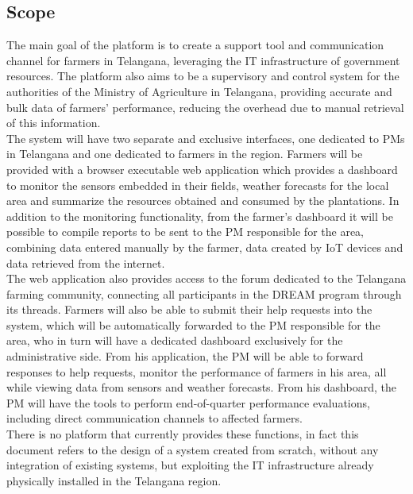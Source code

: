 \documentclass[10pt]{article} %
\begin{document}
\subsection{Scope}
The main goal of the platform is to create a support tool and communication channel for farmers in Telangana, 
leveraging the IT infrastructure of government resources. The platform also aims to be a 
supervisory and control system for the authorities of the Ministry of Agriculture in Telangana, 
providing accurate and bulk data of farmers' performance, reducing the overhead due to manual retrieval of this information.\\
The system will have two separate and exclusive interfaces, one dedicated to PMs in Telangana 
and one dedicated to farmers in the region. Farmers will be provided with a browser 
executable web application which provides a dashboard to monitor the sensors embedded 
in their fields, weather forecasts for the local area and summarize the resources 
obtained and consumed by the plantations. In addition to the monitoring functionality, 
from the farmer's dashboard it will be possible to compile reports to be sent to the PM 
responsible for the area, combining data entered manually by the farmer, data created by 
IoT devices and data retrieved from the internet.\\
The web application also provides access to the forum dedicated to the Telangana farming community, 
connecting all participants in the DREAM program through its threads.
Farmers will also be able to submit their help requests into the system, which will be automatically forwarded 
to the PM responsible for the area, who in turn will have a dedicated dashboard exclusively for the administrative side.
From his application, the PM will be able to forward responses to help requests, monitor the performance of 
farmers in his area, all while viewing data from sensors and weather forecasts.
From his dashboard, the PM will have the tools to perform end-of-quarter performance evaluations, 
including direct communication channels to affected farmers.\\
There is no platform that currently provides these functions, in fact this document refers to the design of a system 
created from scratch, without any integration of existing systems, but exploiting the IT infrastructure 
already physically installed in the Telangana region.
\end{document}
